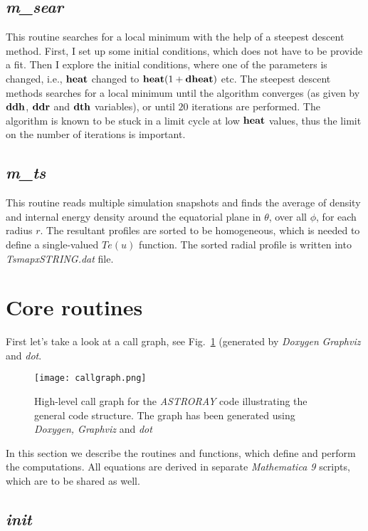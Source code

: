 \documentclass{emulateapj}
\newcommand{\mat}{\textit{Mathematica 9 }}
\begin{document}
\subsection{\textit{m\_sear}}
This routine searches for a local minimum with the help of a steepest
descent method.  First, I set up some initial conditions, which does
not have to be provide a fit.  Then I explore the initial conditions,
where one of the parameters is changed, i.e., ${\bf heat}$ changed to
${\bf heat}(1+{\bf dheat})$ etc. The steepest descent methods searches
for a local minimum until the algorithm converges (as given by ${\bf
  ddh}$, ${\bf ddr}$ and ${\bf dth}$ variables), or until $20$
iterations are performed.  The algorithm is known to be stuck in a
limit cycle at low ${\bf heat}$ values, thus the limit on the number
of iterations is important.

\subsection{\textit{m\_ts}}
This routine reads multiple simulation snapshots and finds the average
of density and internal energy density around the equatorial plane in
$\theta$, over all $\phi$, for each radius $r$.  The resultant
profiles are sorted to be homogeneous, which is needed to define a
single-valued $Te(u)$ function.  The sorted radial profile is written
into \textit{TsmapxSTRING.dat} file.

\section{Core routines}
First let's take a look at a call graph, see Fig.~\ref{fig:callgraph}
(generated by \textit{Doxygen} \textit{Graphviz} and \textit{dot}.
\begin{figure}
\texttt{[image: callgraph.png]}
\caption{\label{fig:callgraph}High-level call graph for the
  \textit{ASTRORAY} code illustrating the general code structure. The graph has been generated using \textit{Doxygen, Graphviz} and \textit{dot}}
\end{figure}
In this section we describe the routines and functions, which define
and perform the computations.  All equations are derived in separate
\mat scripts, which are to be shared as well.
\subsection{\textit{init}}
\end{document}
